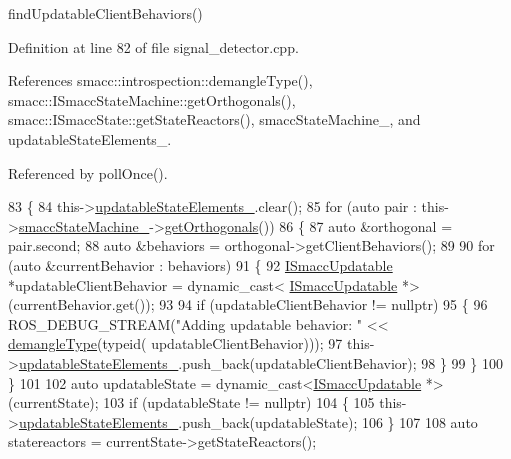 find\+Updatable\+Client\+Behaviors() 

Definition at line 82 of file signal\+\_\+detector.\+cpp.



References smacc\+::introspection\+::demangle\+Type(), smacc\+::\+I\+Smacc\+State\+Machine\+::get\+Orthogonals(), smacc\+::\+I\+Smacc\+State\+::get\+State\+Reactors(), smacc\+State\+Machine\+\_\+, and updatable\+State\+Elements\+\_\+.



Referenced by poll\+Once().


\begin{DoxyCode}
83 \{
84     this->\hyperlink{classsmacc_1_1SignalDetector_a07a5e7bb00c348435d954e22682fa610}{updatableStateElements\_}.clear();
85     \textcolor{keywordflow}{for} (\textcolor{keyword}{auto} pair : this->\hyperlink{classsmacc_1_1SignalDetector_a46025de6ac7b5980e22144f9703236a4}{smaccStateMachine\_}->\hyperlink{classsmacc_1_1ISmaccStateMachine_a7f5b2882dbd077584767cb2533ed3c49}{getOrthogonals}())
86     \{
87         \textcolor{keyword}{auto} &orthogonal = pair.second;
88         \textcolor{keyword}{auto} &behaviors = orthogonal->getClientBehaviors();
89 
90         \textcolor{keywordflow}{for} (\textcolor{keyword}{auto} &currentBehavior : behaviors)
91         \{
92             \hyperlink{classISmaccUpdatable}{ISmaccUpdatable} *updatableClientBehavior = \textcolor{keyword}{dynamic\_cast<}
      \hyperlink{classISmaccUpdatable}{ISmaccUpdatable} *\textcolor{keyword}{>}(currentBehavior.get());
93 
94             \textcolor{keywordflow}{if} (updatableClientBehavior != \textcolor{keyword}{nullptr})
95             \{
96                 ROS\_DEBUG\_STREAM(\textcolor{stringliteral}{"Adding updatable behavior: "} << \hyperlink{namespacesmacc_1_1introspection_a670e39ccea29952859df4e2d0e45077b}{demangleType}(\textcolor{keyword}{typeid}(
      updatableClientBehavior)));
97                 this->\hyperlink{classsmacc_1_1SignalDetector_a07a5e7bb00c348435d954e22682fa610}{updatableStateElements\_}.push\_back(updatableClientBehavior);
98             \}
99         \}
100     \}
101 
102     \textcolor{keyword}{auto} updatableState = \textcolor{keyword}{dynamic\_cast<}\hyperlink{classISmaccUpdatable}{ISmaccUpdatable} *\textcolor{keyword}{>}(currentState);
103     \textcolor{keywordflow}{if} (updatableState != \textcolor{keyword}{nullptr})
104     \{
105         this->\hyperlink{classsmacc_1_1SignalDetector_a07a5e7bb00c348435d954e22682fa610}{updatableStateElements\_}.push\_back(updatableState);
106     \}
107 
108     \textcolor{keyword}{auto} statereactors = currentState->getStateReactors();

\end{DoxyCode}
